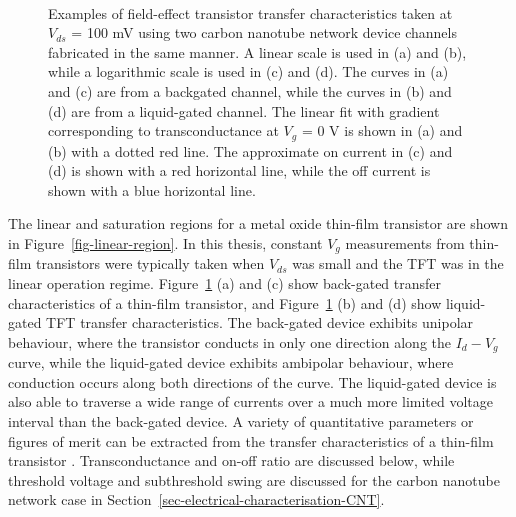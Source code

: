 \documentclass[
  a4paper,
]{scrbook}
\begin{document}
\begin{figure}
\begin{minipage}[t]{0.45\linewidth}
{{}

}

\end{minipage}%
%
\begin{minipage}[t]{0.01\linewidth}

{\centering 

~

}

\end{minipage}%

\caption[Examples of field-effect transistor transfer characteristics
when back-gated and liquid-gated, showing transconductance, on-current
and off-current.]{\label{fig-gating-transfer}Examples of field-effect
transistor transfer characteristics taken at \(V_{ds}\) = 100 mV using
two carbon nanotube network device channels fabricated in the same
manner. A linear scale is used in (a) and (b), while a logarithmic scale
is used in (c) and (d). The curves in (a) and (c) are from a backgated
channel, while the curves in (b) and (d) are from a liquid-gated
channel. The linear fit with gradient corresponding to transconductance
at \(V_g\) = 0 V is shown in (a) and (b) with a dotted red line. The
approximate on current in (c) and (d) is shown with a red horizontal
line, while the off current is shown with a blue horizontal line.}

\end{figure}

The linear and saturation regions for a metal oxide thin-film transistor
are shown in Figure~\ref{fig-linear-region}. In this thesis, constant
\(V_g\) measurements from thin-film transistors were typically taken
when \(V_{ds}\) was small and the TFT was in the linear operation
regime. Figure~\ref{fig-gating-transfer} (a) and (c) show back-gated
transfer characteristics of a thin-film transistor, and
Figure~\ref{fig-gating-transfer} (b) and (d) show liquid-gated TFT
transfer characteristics. The back-gated device exhibits unipolar
behaviour, where the transistor conducts in only one direction along the
\(I_d - V_g\) curve, while the liquid-gated device exhibits ambipolar
behaviour, where conduction occurs along both directions of the curve.
The liquid-gated device is also able to traverse a wide range of
currents over a much more limited voltage interval than the back-gated
device. A variety of quantitative parameters or figures of merit can be
extracted from the transfer characteristics of a thin-film transistor
\autocite{Petti2016}. Transconductance and on-off ratio are discussed
below, while threshold voltage and subthreshold swing are discussed for
the carbon nanotube network case in
Section~\ref{sec-electrical-characterisation-CNT}.
\end{document}
